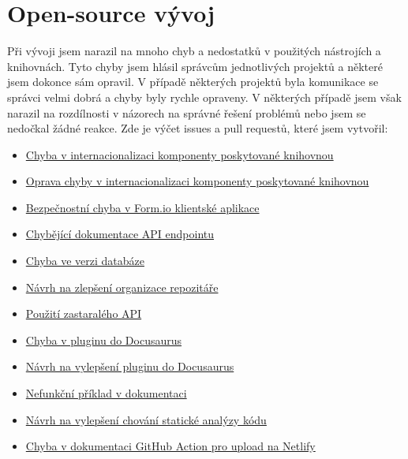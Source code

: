 \section{Open-source vývoj}\label{sec:open-source-vyvoj}

Při vývoji jsem narazil na mnoho chyb a nedostatků v použitých nástrojích a knihovnách.
Tyto chyby jsem hlásil správcům jednotlivých projektů a některé jsem dokonce sám opravil.
V případě některých projektů byla komunikace se správci velmi dobrá a chyby byly rychle opraveny.
V některých případě jsem však narazil na rozdílnosti v názorech na správné řešení problémů nebo jsem se nedočkal žádné reakce.
Zde je výčet issues a pull requestů, které jsem vytvořil:

\begin{itemize}
    \item
    \href{https://github.com/formio/react/issues/522}{Chyba v internacionalizaci komponenty poskytované knihovnou}
    \item
    \href{https://github.com/formio/react/pull/538}{Oprava chyby v internacionalizaci komponenty poskytované knihovnou}
    \item
    \href{https://github.com/formio/formio-app-formio/issues/35}{Bezpečnostní chyba v Form.io klientské aplikace}
    \item
    \href{https://github.com/formio/formio/issues/1555}{Chybějící dokumentace API endpointu}
    \item
    \href{https://github.com/formio/formio/issues/1485}{Chyba ve verzi databáze}
    \item
    \href{https://github.com/formio/formio-app-formio/issues/34}{Návrh na zlepšení organizace repozitáře}
    \item
    \href{https://github.com/formio/react/issues/523}{Použití zastaralého API}
    \item
    \href{https://github.com/tgreyuk/typedoc-plugin-markdown/issues/429}{Chyba v pluginu do Docusaurus}
    \item
    \href{https://github.com/tgreyuk/typedoc-plugin-markdown/issues/440}{Návrh na vylepšení pluginu do Docusaurus}
    \item
    \href{https://github.com/react-bootstrap/react-bootstrap/issues/6671}{Nefunkční příklad v dokumentaci}
    \item
    \href{https://github.com/gajus/eslint-plugin-jsdoc/issues/1138}{Návrh na vylepšení chování statické analýzy kódu}
    \item
    \href{https://github.com/MrFlynn/upload-to-netlify-action/issues/17}{Chyba v dokumentaci GitHub Action pro upload na Netlify}
\end{itemize}



